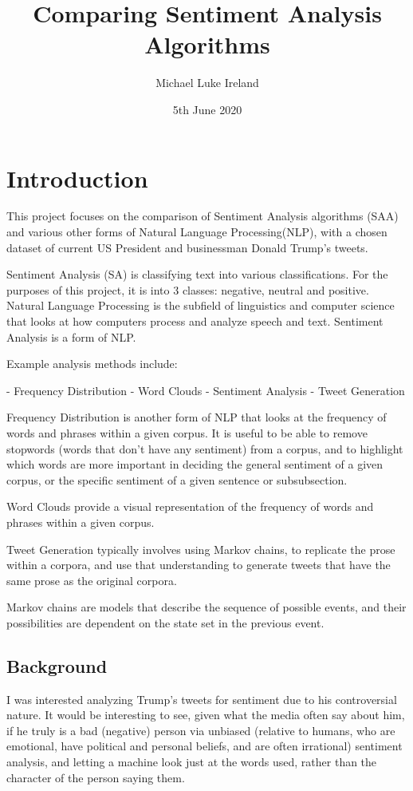 \documentclass{article}
\title{Comparing Sentiment Analysis Algorithms}
\date{5th June 2020}
\author{Michael Luke Ireland}
\begin{document}
\maketitle
\newpage
\tableofcontents
\newpage
{}

\section{Introduction}
This project focuses on the comparison of Sentiment Analysis algorithms (SAA) and various other forms of Natural Language Processing(NLP), with a chosen dataset of current US President and businessman Donald Trump's tweets.

Sentiment Analysis (SA) is classifying text into various classifications.
For the purposes of this project, it is into 3 classes: negative, neutral and positive.
Natural Language Processing is the subfield of linguistics and computer science that looks at how computers process and analyze speech and text.
Sentiment Analysis is a form of NLP.

Example analysis methods include:

- Frequency Distribution
- Word Clouds
- Sentiment Analysis
- Tweet Generation

Frequency Distribution is another form of NLP that looks at the frequency of words and phrases within a given corpus.
It is useful to be able to remove stopwords (words that don't have any sentiment) from a corpus, and to highlight which words are more important in deciding the general sentiment of a given corpus, or the specific sentiment of a given sentence or subsubsection.

Word Clouds provide a visual representation of the frequency of words and phrases within a given corpus.

Tweet Generation typically involves using Markov chains, to replicate the prose within a corpora, and use that understanding to generate tweets that have the same prose as the original corpora.

Markov chains are models that describe the sequence of possible events, and their possibilities are dependent on the state set in the previous event.

\subsection{Background}

I was interested analyzing Trump's tweets for sentiment due to his controversial nature.
It would be interesting to see, given what the media often say about him, if he truly is a bad (negative) person via unbiased (relative to humans, who are emotional, have political and personal beliefs, and are often irrational) sentiment analysis, and letting a machine look just at the words used, rather than the character of the person saying them.
\end{document}
